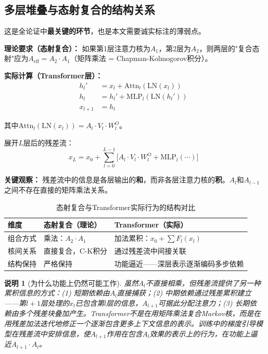 \documentclass[11pt,a4paper]{ctexart}
\newtheorem{remark}[theorem]{说明}
\begin{document}
\subsection{多层堆叠与态射复合的结构关系}

这是全论证中\textbf{最关键的环节}，也是本文需要诚实标注的薄弱点。

\textbf{理论要求（态射复合）：} 如果第1层注意力核为$A_1$，第2层为$A_2$，则两层的"复合态射"应为$A_{\mathrm{eff}} = A_2 \cdot A_1$（矩阵乘法 = Chapman-Kolmogorov积分）。

\textbf{实际计算（Transformer层）：}
\begin{align}
    h_l' &= x_l + \mathrm{Attn}_l(\mathrm{LN}(x_l)) \label{eq:transformer1}\\
    h_l  &= h_l' + \mathrm{MLP}_l(\mathrm{LN}(h_l')) \label{eq:transformer2}\\
    x_{l+1} &= h_l \label{eq:transformer3}
\end{align}

其中$\mathrm{Attn}_l(\mathrm{LN}(x_l)) = A_l \cdot V_l \cdot W_l^O$。

展开$L$层后的残差流：
\begin{equation}
    x_L = x_0 + \sum_{l=0}^{L-1} \bigl[A_l \cdot V_l \cdot W_l^O + \mathrm{MLP}_l(\cdots)\bigr]
    \label{eq:residual}
\end{equation}

\textbf{关键观察：} 残差流中的信息是各层输出的\textbf{和}，而非各层注意力核的\textbf{积}。$A_l$和$A_{l-1}$之间不存在直接的矩阵乘法关系。

\begin{table}[htbp]
\centering
\caption{态射复合与Transformer实际行为的结构对比}
\label{tab:composition_gap}
\begin{tabular}{@{}p{2.5cm}ll@{}}
\toprule
\textbf{维度} & \textbf{态射复合（理论）} & \textbf{Transformer（实际）} \\
\midrule
组合方式  & 乘法：$A_2 \cdot A_1$ & 加法累积：$x_0 + \sum F_l(x_l)$ \\
核间关系 & 直接复合，C-K积分 & 通过残差流中间接关联 \\
结构保持 & 严格保持 & 功能逼近——深层表示逐渐编码多步依赖 \\
\bottomrule
\end{tabular}
\end{table}

\begin{remark}[为什么功能上仍然可能工作]
    虽然$A_l$不直接相乘，但残差流提供了另一种累积信息的方式：(1) 短期依赖由$A_l$直接捕获；(2) 中期依赖通过残差累积建立——第$l+1$层处理的$x_l$已包含第$l$层的信息，$A_{l+1}$可据此分配注意力；(3) 长期依赖由多个残差块叠加产生。Transformer不是在用矩阵乘法复合Markov核，而是在用残差加法迭代地修正一个逐渐包含更多上下文信息的表示。训练中的梯度引导模型在残差流中安排信息，使$A_{l+1}$作用在包含$A_l$效果的表示上的行为，在功能上逼近$A_{l+1} \cdot A_l$。
\end{remark}
\end{document}
